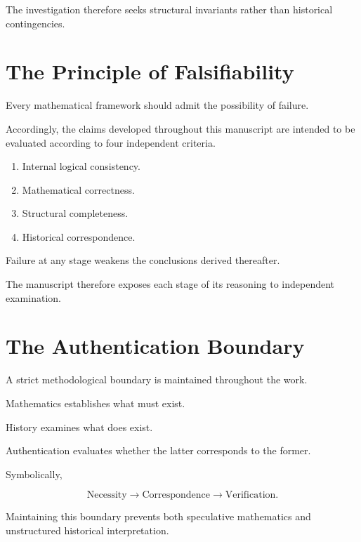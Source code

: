 \documentclass[11pt,openany]{book}
\theoremstyle{plain}
\theoremstyle{definition}
\begin{document}
The investigation therefore seeks structural invariants rather than historical contingencies.


\section*{The Principle of Falsifiability}

Every mathematical framework should admit the possibility of failure.

Accordingly, the claims developed throughout this manuscript are intended to be evaluated according to four independent criteria.

\begin{enumerate}

\item Internal logical consistency.

\item Mathematical correctness.

\item Structural completeness.

\item Historical correspondence.

\end{enumerate}

Failure at any stage weakens the conclusions derived thereafter.

The manuscript therefore exposes each stage of its reasoning to independent examination.


\section*{The Authentication Boundary}

A strict methodological boundary is maintained throughout the work.

Mathematics establishes what must exist.

History examines what does exist.

Authentication evaluates whether the latter corresponds to the former.

Symbolically,

\[
\boxed{
\text{Necessity}
\longrightarrow
\text{Correspondence}
\longrightarrow
\text{Verification}.
}
\]

Maintaining this boundary prevents both speculative mathematics and unstructured historical interpretation.
\end{document}
